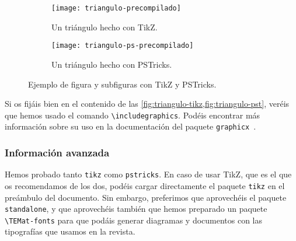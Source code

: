 \documentclass[bibtex, anon]{TEMat-article}
\begin{document}
\begin{figure}[hbt!]
  \centering
  \begin{subfigure}[b]{0.31\textwidth}
    \texttt{[image: triangulo-precompilado]} %
    \caption{Un triángulo hecho con TikZ.}\label{fig:triangulo-tikz}
  \end{subfigure}
  \hspace{0.1\textwidth}
  \begin{subfigure}[b]{0.31\textwidth}
    \texttt{[image: triangulo-ps-precompilado]} %
    \caption{Un triángulo hecho con PSTricks.}\label{fig:triangulo-pst}
  \end{subfigure}
  \caption{Ejemplo de figura y subfiguras con TikZ y PSTricks.}\label{fig:triangulos}
\end{figure}

Si os fijáis bien en el contenido de las \cref{fig:triangulo-tikz,fig:triangulo-pst}, veréis que hemos usado el comando \verb+\includegraphics+.
Podéis encontrar más información sobre su uso en la documentación del paquete \verb+graphicx+~\cite[sec.~4]{graphics}.

\subsubsection{Información avanzada}\label{sec:diagramas:avanzado}
Hemos probado tanto \verb+tikz+ como \verb+pstricks+.
En caso de usar TikZ, que es el que os recomendamos de los dos, podéis cargar directamente el paquete \verb+tikz+ en el preámbulo del documento.
Sin embargo, preferimos que aprovechéis el paquete \verb+standalone+, y que aprovechéis también que hemos preparado un paquete \verb+\TEMat-fonts+ para que podáis generar diagramas y documentos con las tipografías que usamos en la revista.
\end{document}
